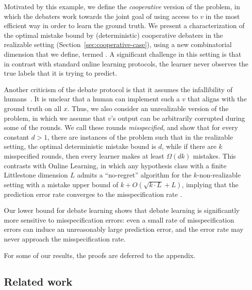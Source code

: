 Motivated by this example, we define the \emph{cooperative} version of the problem,
in which the debaters work towards the joint goal of using access to $v$ in the most efficient way in order to learn the ground truth. We present a characterization of the optimal mistake bound by (deterministic) cooperative debaters in the realizable setting (Section~\ref{sec:cooperative-case}), using a new combinatorial dimension that we define, termed \emph{\debatedimname}. A significant challenge in this setting is that in contrast with standard online learning protocols, the learner never observes the true labels that it is trying to predict. 

Another criticism of the debate protocol is that it assumes the infallibility of humans~\citep{irving2019social,browncohen2024debate,parrish2022single,parrish2022two}. It is unclear that a human can implement such a $v$ that aligns with the ground truth on all $x$. Thus, we also consider an unrealizable version of the problem, in which we assume that $v$'s output can be arbitrarily corrupted during some of the rounds. We call these rounds \emph{misspecified}, and show that for every constant $d > 1$, there are instances of the problem such that in the realizable setting, the optimal deterministic mistake bound is $d$, while if there are $k$ misspecified rounds, 
then every learner makes at least $\Omega(dk)$ mistakes. This contrasts with Online Learning, in which any hypothesis class with a finite Littlestone dimension $L$ admits a ``no-regret'' algorithm for the $k$-non-realizable setting with a mistake upper bound of $k +O(\sqrt{k\cdot L} + L)$, implying that the prediction error rate converges to the misspecification rate \citep{FilmusHaMeMo23,BenDavidPaSh09,AlonBeDaMoNaYo21}. 

Our lower bound for debate learning shows that debate learning is significantly more  sensitive to misspecification errors: even a small rate of misspecification errors can induce an unreasonably large prediction error, and the error rate may never approach the misspecification rate. 

For some of our results, the proofs are deferred to the appendix.

\subsection{Related work}

